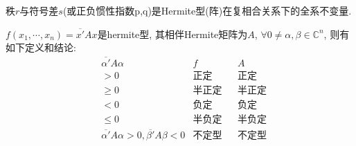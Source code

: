 \begin{theorem}
  秩$r$与符号差$s$(或正负惯性指数p,q)是Hermite型(阵)在复相合关系下的全系不变量.
\end{theorem}

\begin{definition}
  $f(x_1,\cdots,x_n)=\overline{x'}Ax$是hermite型,
  其相伴Hermite矩阵为$A$, $\forall 0 \neq \alpha, \beta \in \mathbb{C}^n$,
  则有如下定义和结论:
  \begin{align*}
    &\overline{\alpha'}A\alpha & f &&A\\
    &>0&\text{正定}&&\text{正定}\\
    &\geq 0&\text{半正定}&&\text{半正定}\\
    &<0&\text{负定}&&\text{负定}\\
    &\leq 0&\text{半负定}&&\text{半负定}\\
    &\overline{\alpha'}A\alpha>0, \overline{\beta'}A\beta<0 & \text{不定型} && \text{不定型}
  \end{align*}
\end{definition}

